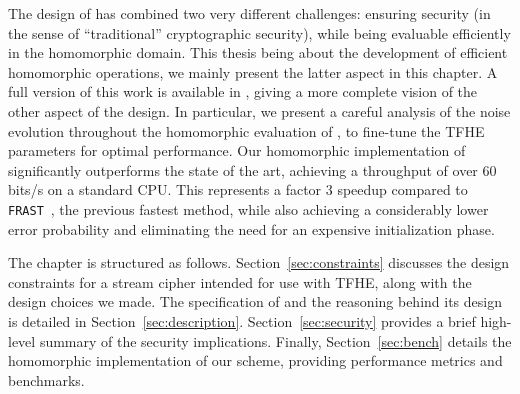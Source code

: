 The design of \coolName has combined two very different challenges: ensuring security (in the sense of ``traditional'' cryptographic security), while being evaluable efficiently in the homomorphic domain. This thesis being about the development of efficient homomorphic operations, we mainly present the latter aspect in this chapter. A full version of this work is available in \cite{transistor}, giving a more complete vision of the other aspect of the design. In particular, we present a careful analysis of the noise evolution throughout  the homomorphic evaluation of \coolName, to fine-tune the \gls{TFHE} parameters for optimal performance. Our homomorphic implementation of \coolName{} significantly outperforms the state of the art, achieving a throughput of over 60 bits/s on a standard CPU. This represents a factor 3 speedup compared to \texttt{FRAST}~\cite{ToSC:CCHLOS24}, the previous fastest method, while also achieving a considerably lower error probability and eliminating the need for an expensive initialization phase.


The chapter is structured as follows. Section~\ref{sec:constraints} discusses the design constraints for a stream cipher intended for use with \gls{TFHE}, along with the design choices we made. The specification of \coolName{} and the reasoning behind its design is detailed in Section~\ref{sec:description}. Section~\ref{sec:security} provides a brief high-level summary of the security implications. Finally, Section~\ref{sec:bench} details the homomorphic implementation of our scheme, providing performance metrics and benchmarks.

